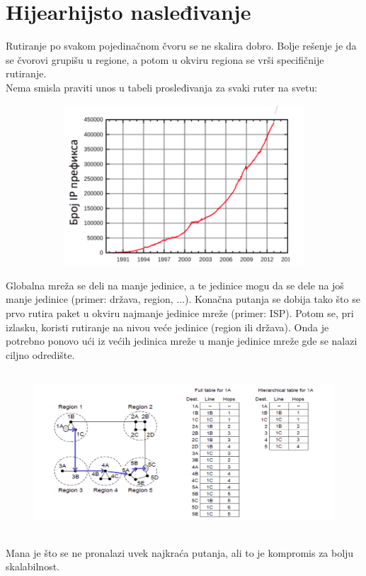 \documentclass[a4paper]{article}
\begin{document}
\section{Hijearhijsto nasleđivanje}
    Rutiranje po svakom pojedinačnom čvoru se ne skalira dobro. Bolje rešenje je da se čvorovi
    grupišu u regione, a potom u okviru regiona se vrši specifičnije rutiranje. \\
    \indent Nema smisla praviti unos u tabeli prosleđivanja za svaki ruter na svetu:
    \begin{figure}[H]
        \begin{center}
            \includegraphics[width=120mm,height=60mm]{Slike/grafik_prefiksa.png}
        \end{center}
    \end{figure}
    Globalna mreža se deli na manje jedinice, a te jedinice mogu da se dele na 
    još manje jedinice (primer: država, region, ...). Konačna putanja se dobija tako što 
    se prvo rutira paket u okviru najmanje jedinice mreže (primer: ISP). Potom se, pri izlasku, 
    koristi rutiranje na nivou veće jedinice (region ili država). Onda je potrebno ponovo 
    ući iz većih jedinica mreže u manje jedinice mreže gde se nalazi ciljno odredište. 
    \begin{figure}[H]
        \begin{center}
            \includegraphics[width=120mm,height=60mm]{Slike/hijearhijsko_rutiranje.png}
        \end{center}
    \end{figure}
    Mana je što se ne pronalazi uvek najkraća putanja, ali to je kompromis za bolju skalabilnost.
\end{document}
